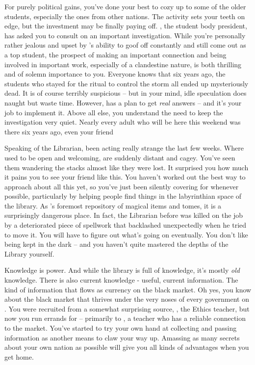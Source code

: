 \documentclass[char]{GL2020}
\begin{document}
For purely political gains, you've done your best to cozy up to some of the older students, especially the ones from other nations. The activity sets your teeth on edge, but the investment may be finally paying off. \cPresident{}, the student body president, has asked you to consult on an important investigation. While you're personally rather jealous and upset by \cPresident{}'s ability to goof off constantly and still come out as a top student, the prospect of making an important connection and being involved in important work, especially of a clandestine nature, is both thrilling and of solemn importance to you. Everyone knows that six years ago, the students who stayed for the ritual to control the storm all ended up mysteriously dead. It is of course terribly suspicious -- but in your mind, idle speculation does naught but waste time. However, \cPresident{} has a plan to get \emph{real} answers -- and it's your job to implement it. Above all else, you understand the need to keep the investigation very quiet. Nearly every adult who will be here this weekend was there six years ago, even your friend %

Speaking of the Librarian, \cLibrarian{\they} \cLibrarian{\have} been acting really strange the last few weeks. Where \cLibrarian{\they} used to be open and welcoming, \cLibrarian{\they} are suddenly distant and cagey. You've seen them wandering the stacks almost like they were lost. It surprised you how much it pains you to see your friend like this. You haven't worked out the best way to approach \cLibrarian{\them} about all this yet, so you've just been silently covering for \cLibrarian{\them} whenever possible, particularly by helping people find things in the labyrinthian space of the library. As \pEarth{}'s foremost repository of magical items and tomes, it is a surprisingly dangerous place. In fact, the Librarian before \cLibrarian{} was killed on the job by a deteriorated piece of spellwork that backlashed unexpectedly when he tried to move it. You will have to figure out what's going on eventually. You don't like being kept in the dark -- and you haven't quite mastered the depths of the Library yourself.

Knowledge is power. And while the library is full of knowledge, it's mostly \emph{old} knowledge. There is also current knowledge - useful, current information. The kind of information that flows as currency on the black market. Oh yes, you know about the black market that thrives under the very noses of every government on \pEarth{}. You were recruited from a somewhat surprising source, \cEthics{}, the Ethics teacher, but now you run errands for \cEthics{\them} -- primarily to \cChupSecond{}, a teacher who has a reliable connection to the market. You've started to try your own hand at collecting and passing information as another means to claw your way up. Amassing as many secrets about your own nation as possible will give you all kinds of advantages when you get home.
\end{document}
